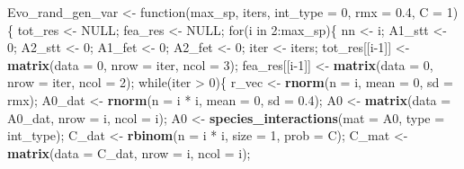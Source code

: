 \documentclass[]{article}
\newenvironment{Shaded}{\begin{snugshade}}{\end{snugshade}}
\newcommand{\KeywordTok}[1]{\textcolor[rgb]{0.13,0.29,0.53}{\textbf{{#1}}}}
\newcommand{\DataTypeTok}[1]{\textcolor[rgb]{0.13,0.29,0.53}{{#1}}}
\newcommand{\DecValTok}[1]{\textcolor[rgb]{0.00,0.00,0.81}{{#1}}}
\newcommand{\FloatTok}[1]{\textcolor[rgb]{0.00,0.00,0.81}{{#1}}}
\newcommand{\StringTok}[1]{\textcolor[rgb]{0.31,0.60,0.02}{{#1}}}
\newcommand{\OtherTok}[1]{\textcolor[rgb]{0.56,0.35,0.01}{{#1}}}
\newcommand{\NormalTok}[1]{{#1}}
\begin{document}
\begin{Shaded}
\begin{Highlighting}[]
\NormalTok{Evo_rand_gen_var <-}\StringTok{ }\NormalTok{function(max_sp, iters, }\DataTypeTok{int_type =} \DecValTok{0}\NormalTok{, }\DataTypeTok{rmx =} \FloatTok{0.4}\NormalTok{, }\DataTypeTok{C =} \DecValTok{1}\NormalTok{)\{}
    \NormalTok{tot_res <-}\StringTok{ }\OtherTok{NULL}\NormalTok{;}
    \NormalTok{fea_res <-}\StringTok{ }\OtherTok{NULL}\NormalTok{;}
    \NormalTok{for(i in }\DecValTok{2}\NormalTok{:max_sp)\{}
        \NormalTok{nn             <-}\StringTok{ }\NormalTok{i;}
        \NormalTok{A1_stt         <-}\StringTok{ }\DecValTok{0}\NormalTok{;}
        \NormalTok{A2_stt         <-}\StringTok{ }\DecValTok{0}\NormalTok{;}
        \NormalTok{A1_fet         <-}\StringTok{ }\DecValTok{0}\NormalTok{;}
        \NormalTok{A2_fet         <-}\StringTok{ }\DecValTok{0}\NormalTok{;}
        \NormalTok{iter           <-}\StringTok{ }\NormalTok{iters;}
        \NormalTok{tot_res[[i}\DecValTok{-1}\NormalTok{]] <-}\StringTok{ }\KeywordTok{matrix}\NormalTok{(}\DataTypeTok{data =} \DecValTok{0}\NormalTok{, }\DataTypeTok{nrow =} \NormalTok{iter, }\DataTypeTok{ncol =} \DecValTok{3}\NormalTok{);}
        \NormalTok{fea_res[[i}\DecValTok{-1}\NormalTok{]] <-}\StringTok{ }\KeywordTok{matrix}\NormalTok{(}\DataTypeTok{data =} \DecValTok{0}\NormalTok{, }\DataTypeTok{nrow =} \NormalTok{iter, }\DataTypeTok{ncol =} \DecValTok{2}\NormalTok{);}
        \NormalTok{while(iter >}\StringTok{ }\DecValTok{0}\NormalTok{)\{}
            \NormalTok{r_vec    <-}\StringTok{ }\KeywordTok{rnorm}\NormalTok{(}\DataTypeTok{n =} \NormalTok{i, }\DataTypeTok{mean =} \DecValTok{0}\NormalTok{, }\DataTypeTok{sd =} \NormalTok{rmx);}
            \NormalTok{A0_dat   <-}\StringTok{ }\KeywordTok{rnorm}\NormalTok{(}\DataTypeTok{n =} \NormalTok{i *}\StringTok{ }\NormalTok{i, }\DataTypeTok{mean =} \DecValTok{0}\NormalTok{, }\DataTypeTok{sd =} \FloatTok{0.4}\NormalTok{);}
            \NormalTok{A0       <-}\StringTok{ }\KeywordTok{matrix}\NormalTok{(}\DataTypeTok{data =} \NormalTok{A0_dat, }\DataTypeTok{nrow =} \NormalTok{i, }\DataTypeTok{ncol =} \NormalTok{i);}
            \NormalTok{A0       <-}\StringTok{ }\KeywordTok{species_interactions}\NormalTok{(}\DataTypeTok{mat =} \NormalTok{A0, }\DataTypeTok{type =} \NormalTok{int_type);}
            \NormalTok{C_dat    <-}\StringTok{ }\KeywordTok{rbinom}\NormalTok{(}\DataTypeTok{n =} \NormalTok{i *}\StringTok{ }\NormalTok{i, }\DataTypeTok{size =} \DecValTok{1}\NormalTok{, }\DataTypeTok{prob =} \NormalTok{C);}
            \NormalTok{C_mat    <-}\StringTok{ }\KeywordTok{matrix}\NormalTok{(}\DataTypeTok{data =} \NormalTok{C_dat, }\DataTypeTok{nrow =} \NormalTok{i, }\DataTypeTok{ncol =} \NormalTok{i);}

\end{Highlighting}
\end{Shaded}
\end{document}
